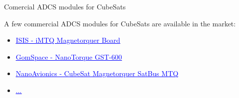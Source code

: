 %
%
%
%
%

%
%
%
%
%


\begin{frame}{Comercial ADCS modules for CubeSats}

    A few commercial ADCS modules for CubeSats are available in the market:

    \begin{itemize}
        \item \href{https://www.isispace.nl/product/isis-magnetorquer-board/}{\textcolor{blue}{\underline{ISIS - iMTQ Magnetorquer Board}}}
        \vspace{0.4cm}
        \item \href{https://gomspace.com/shop/subsystems/attitude-orbit-control-systems/nanotorque-gst-600.aspx}{\textcolor{blue}{\underline{GomSpace - NanoTorque GST-600}}}
        \vspace{0.4cm}
        \item \href{https://nanoavionics.com/cubesat-components/cubesat-magnetorquer-satbus-mtq/}{\textcolor{blue}{\underline{NanoAvionics - CubeSat Magnetorquer SatBus MTQ}}}
        \vspace{0.4cm}
        \item \href{}{\textcolor{blue}{\underline{...}}}
    \end{itemize}

\end{frame}


